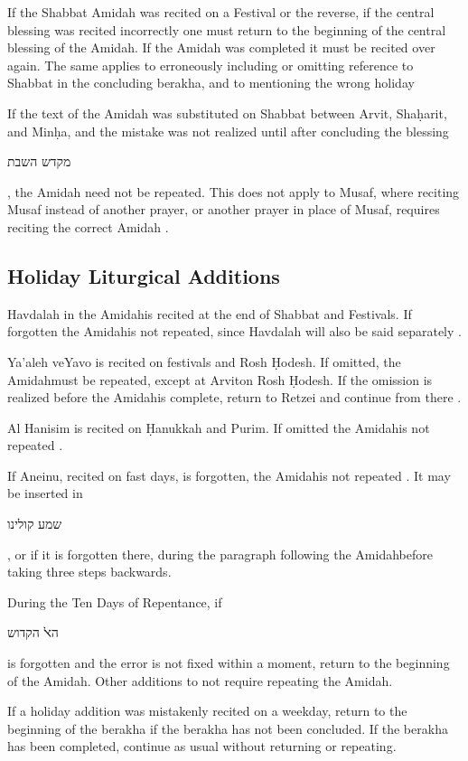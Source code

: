 \documentclass[11pt]{article}
\newcommand{\hebword}[1]{‎\begin{hebrew}\beginR #1 \endR\end{hebrew}}
\newcommand{\bigheth}{\d{H}}
\newcommand{\amidah}{Amidah\space}
\newcommand{\amidahnospace}{Amidah}
\newcommand{\arvit}{Arvit}
\begin{document}
If the Shabbat Amidah was recited on a Festival or the reverse, if the central blessing was recited incorrectly one must return to the beginning of the central blessing of the Amidah.  If the Amidah was completed it must be recited over again.  The same applies to erroneously including or omitting reference to Shabbat in the concluding berakha, and to mentioning the wrong holiday \parencite*[2:3:4]{PHYT}

If the text of the Amidah was substituted on Shabbat between Arvit, Sha\d{h}arit, and Min\d{h}a, and the mistake was not realized until after concluding the blessing \hebword{מקדש השבת}, the Amidah need not be repeated.  This does not apply to Musaf, where reciting Musaf instead of another prayer, or another prayer in place of Musaf, requires reciting the correct Amidah \parencite*[76:21-22]{Kitzur}.

\subsection{Holiday Liturgical Additions}

Havdalah in the \amidah is recited at the end of Shabbat and Festivals.  If forgotten the \amidah is not repeated, since Havdalah will also be said separately \parencite*[18:2 citing OC 422]{PH}.

Ya'aleh veYavo is recited on festivals and Rosh \bigheth odesh.  If omitted, the \amidah must be repeated, except at \arvit\space on Rosh \bigheth odesh.  If the omission is realized before the \amidah is complete, return to Retzei and continue from there \parencite{PH}.

Al Hanisim is recited on \bigheth anukkah and Purim.  If omitted the \amidah is not repeated \parencite*[citing OC 682]{PH}.

If Aneinu, recited on fast days, is forgotten, the \amidah is not repeated \parencite*[citing OC 565]{PH}. It may be inserted in \hebword{שמע קולינו}, or if it is forgotten there, during the paragraph following the \amidah before taking three steps backwards.

During the Ten Days of Repentance, if \hebword{הﭏ הקדוש} is forgotten and the error is not fixed within a moment, return to the beginning of the \amidahnospace.  Other additions to not require repeating the \amidahnospace.

If a holiday addition was mistakenly recited on a weekday, return to the beginning of the berakha if the berakha has not been concluded.  If the berakha has been completed, continue as usual without returning or repeating.
\end{document}
